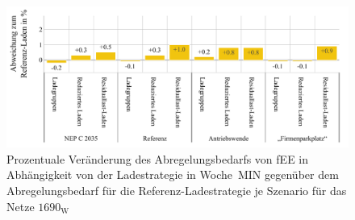 \begin{figure}[H]
    \centering
    \includegraphics[width=\textwidth]{Bilder/1690_cur_fee_grid_week_A}
    \caption[Prozentuale Veränderung des Abregelungsbedarfs von fEE in Abhängigkeit von der Ladestrategie in Woche~MIN gegenüber dem Abregelungsbedarf für die Referenz-Ladestrategie je Szenario für das Netze \num{1690}]{Prozentuale Veränderung des Abregelungsbedarfs von fEE in Abhängigkeit von der Ladestrategie in Woche~MIN gegenüber dem Abregelungsbedarf für die Referenz-Ladestrategie je Szenario für das Netze \(1690_{\text{W}}\)}\label{fig:1690_cur_fee_grid_week_A}
\end{figure}